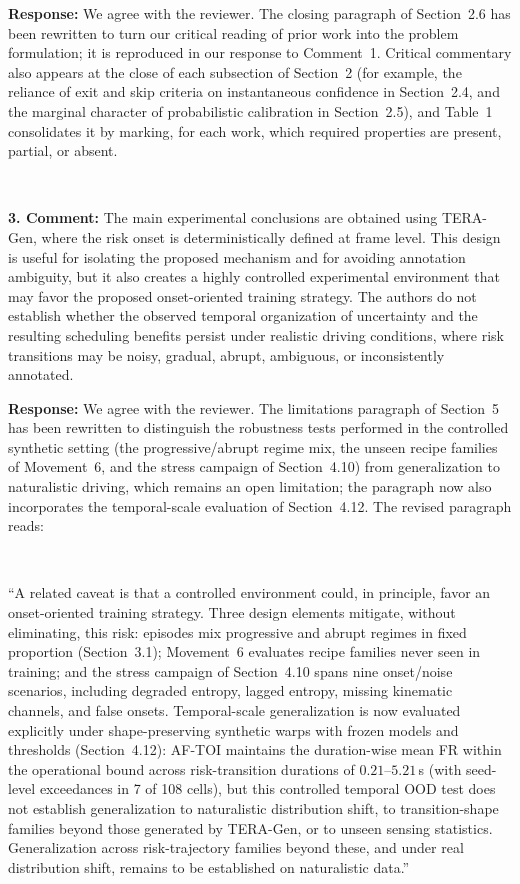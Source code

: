 \documentclass[1p,12pt,authoryear]{elsarticle}
\begin{document}
\vspace{2mm}
\noindent \textbf{Response:} We agree with the reviewer. The closing paragraph of Section~2.6 has been rewritten to turn our critical reading of prior work into the problem formulation; it is reproduced in our response to Comment~1. Critical commentary also appears at the close of each subsection of Section~2 (for example, the reliance of exit and skip criteria on instantaneous confidence in Section~2.4, and the marginal character of probabilistic calibration in Section~2.5), and Table~1 consolidates it by marking, for each work, which required properties are present, partial, or absent.

~

\noindent \textbf{3. Comment:} The main experimental conclusions are obtained using TERA-Gen, where the risk onset is deterministically defined at frame level. This design is useful for isolating the proposed mechanism and for avoiding annotation ambiguity, but it also creates a highly controlled experimental environment that may favor the proposed onset-oriented training strategy. The authors do not establish whether the observed temporal organization of uncertainty and the resulting scheduling benefits persist under realistic driving conditions, where risk transitions may be noisy, gradual, abrupt, ambiguous, or inconsistently annotated.

\vspace{2mm}
\noindent \textbf{Response:} We agree with the reviewer. The limitations paragraph of Section~5 has been rewritten to distinguish the robustness tests performed in the controlled synthetic setting (the progressive/abrupt regime mix, the unseen recipe families of Movement~6, and the stress campaign of Section~4.10) from generalization to naturalistic driving, which remains an open limitation; the paragraph now also incorporates the temporal-scale evaluation of Section~4.12. The revised paragraph reads:

~

``A related caveat is that a controlled environment could, in principle, favor an onset-oriented training strategy. Three design elements mitigate, without eliminating, this risk: episodes mix progressive and abrupt regimes in fixed proportion (Section~3.1); Movement~6 evaluates recipe families never seen in training; and the stress campaign of Section~4.10 spans nine onset/noise scenarios, including degraded entropy, lagged entropy, missing kinematic channels, and false onsets. Temporal-scale generalization is now evaluated explicitly under shape-preserving synthetic warps with frozen models and thresholds (Section~4.12): AF-TOI maintains the duration-wise mean FR within the operational bound across risk-transition durations of $0.21$--$5.21$\,s (with seed-level exceedances in 7 of 108 cells), but this controlled temporal OOD test does not establish generalization to naturalistic distribution shift, to transition-shape families beyond those generated by TERA-Gen, or to unseen sensing statistics. Generalization across risk-trajectory families beyond these, and under real distribution shift, remains to be established on naturalistic data.''
\end{document}
